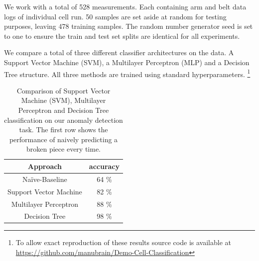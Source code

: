 \documentclass[5p,times,procedia]{elsarticle}
\begin{document}
We work with a total of 528 measurements. Each containing arm and belt data
logs of individual cell run. 50 samples are set aside at random for testing 
purposes, leaving 478 training samples. The random number generator seed is
set to one to ensure the train and test set splits are identical 
for all experiments.

We compare a total of three different classifier architectures on the data.
A Support Vector Machine (SVM), a Multilayer Perceptron (MLP) and a Decision Tree
structure. All three methods are trained using standard hyperparameters.
\footnote{To allow exact reproduction of these results source
code is available at \url{https://github.com/manubrain/Demo-Cell-Classification}}

\begin{table}
       \centering
       \begin{tabular}{ c c } \toprule
              Approach         & accuracy \\ \midrule
              Na\"ive-Baseline & 64 \% \\
              Support Vector Machine & 82 \% \\
              Multilayer Perceptron & 88 \% \\
              Decision Tree         & 98 \% \\ \bottomrule
       \end{tabular}
       \caption{Comparison of Support Vector Machine (SVM), Multilayer Perceptron and 
                Decision Tree classification on our anomaly detection task. 
                The first row shows the performance of naively predicting a broken piece
                every time.}
       \label{tab:class_comp}
\end{table}
\end{document}
